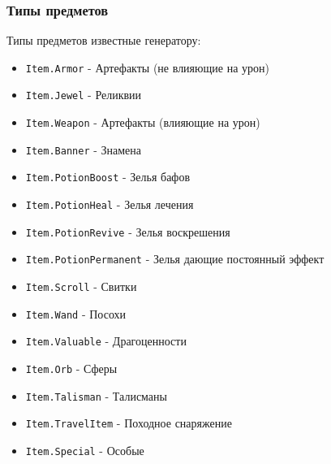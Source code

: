 \subsubsection{Типы предметов}
\label{itemTypes}
Типы предметов известные генератору:
\begin{itemize}
\item \texttt{Item.Armor} - Артефакты (не влияющие на урон)
\item \texttt{Item.Jewel} - Реликвии
\item \texttt{Item.Weapon} - Артефакты (влияющие на урон)
\item \texttt{Item.Banner} - Знамена
\item \texttt{Item.PotionBoost} - Зелья бафов
\item \texttt{Item.PotionHeal} - Зелья лечения
\item \texttt{Item.PotionRevive} - Зелья воскрешения
\item \texttt{Item.PotionPermanent} - Зелья дающие постоянный эффект
\item \texttt{Item.Scroll} - Свитки
\item \texttt{Item.Wand} - Посохи
\item \texttt{Item.Valuable} - Драгоценности
\item \texttt{Item.Orb} - Сферы
\item \texttt{Item.Talisman} - Талисманы
\item \texttt{Item.TravelItem} - Походное снаряжение
\item \texttt{Item.Special} - Особые
\end{itemize}

